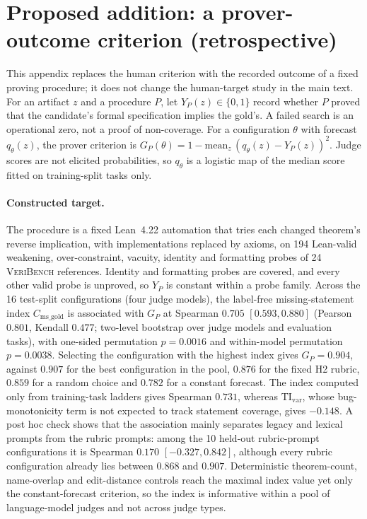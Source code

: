 \section{Proposed addition: a prover-outcome criterion (retrospective)}\label{app:prover-target}
This appendix replaces the human criterion with the recorded outcome of a fixed proving procedure; it does not change the human-target study in the main text.
For an artifact $z$ and a procedure $P$, let $Y_P(z)\in\{0,1\}$ record whether $P$ proved that the candidate's formal specification implies the gold's.
A failed search is an operational zero, not a proof of non-coverage.
For a configuration $\theta$ with forecast $q_\theta(z)$, the prover criterion is $G_P(\theta)=1-\mathrm{mean}_z\,(q_\theta(z)-Y_P(z))^2$.
Judge scores are not elicited probabilities, so $q_\theta$ is a logistic map of the median score fitted on training-split tasks only.

\paragraph{Constructed target.}
The procedure is a fixed Lean~4.22 automation that tries each changed theorem's reverse implication, with implementations replaced by axioms, on 194 Lean-valid weakening, over-constraint, vacuity, identity and formatting probes of 24 \textsc{VeriBench} references.
Identity and formatting probes are covered, and every other valid probe is unproved, so $Y_P$ is constant within a probe family.
Across the 16 test-split configurations (four judge models), the label-free missing-statement index $C_{\mathrm{ms\_gold}}$ is associated with $G_P$ at Spearman $0.705$ $[0.593, 0.880]$ (Pearson $0.801$, Kendall $0.477$; two-level bootstrap over judge models and evaluation tasks), with one-sided permutation $p=0.0016$ and within-model permutation $p=0.0038$.
Selecting the configuration with the highest index gives $G_P=0.904$, against $0.907$ for the best configuration in the pool, $0.876$ for the fixed H2 rubric, $0.859$ for a random choice and $0.782$ for a constant forecast.
The index computed only from training-task ladders gives Spearman $0.731$, whereas $\mathrm{TI}_{\mathrm{var}}$, whose bug-monotonicity term is not expected to track statement coverage, gives $-0.148$.
A post hoc check shows that the association mainly separates legacy and lexical prompts from the rubric prompts: among the 10 held-out rubric-prompt configurations it is Spearman $0.170$ $[-0.327, 0.842]$, although every rubric configuration already lies between $0.868$ and $0.907$.
Deterministic theorem-count, name-overlap and edit-distance controls reach the maximal index value yet only the constant-forecast criterion, so the index is informative within a pool of language-model judges and not across judge types.

